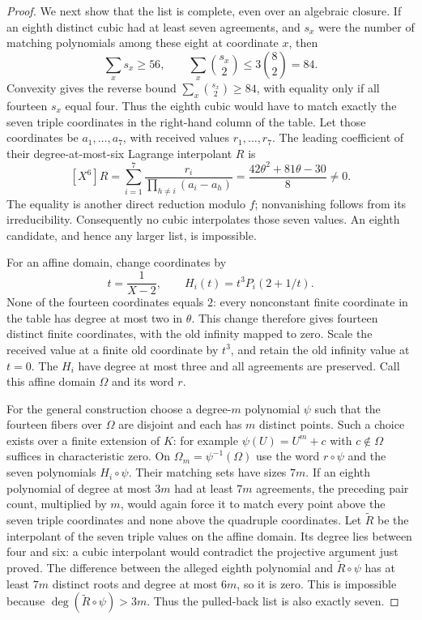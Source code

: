 \begin{proof}
We next show that the list is complete, even over an algebraic closure.
If an eighth distinct cubic had at least seven agreements, and $s_x$
were the number of matching polynomials among these eight at coordinate
$x$, then
\[
 \sum_x s_x\geq56,
 \qquad
 \sum_x\binom{s_x}{2}\leq3\binom82=84.
\]
Convexity gives the reverse bound $\sum_x\binom{s_x}{2}\geq84$,
with equality only if all fourteen $s_x$ equal four.  Thus the eighth
cubic would have to match exactly the seven triple coordinates in the
right-hand column of the table.
Let those coordinates be $a_1,\ldots,a_7$, with received values
$r_1,\ldots,r_7$.  The leading coefficient of their degree-at-most-six
Lagrange interpolant $R$ is
\[
 [X^6]R
 =\sum_{i=1}^7\frac{r_i}{\prod_{h\ne i}(a_i-a_h)}
 =\frac{42\theta^2+81\theta-30}{8}\ne0.
\]
The equality is another direct reduction modulo $f$; nonvanishing follows
from its irreducibility.  Consequently no cubic interpolates those seven
values.  An eighth candidate, and hence any larger list, is impossible.

For an affine domain, change coordinates by
\[
 t=\frac1{X-2},\qquad H_i(t)=t^3P_i(2+1/t).
\]
None of the fourteen coordinates equals $2$: every nonconstant finite
coordinate in the table has degree at most two in $\theta$.
This change therefore gives fourteen distinct finite coordinates, with
the old infinity mapped to zero.  Scale the received value at a finite
old coordinate by $t^3$, and retain the old infinity value at $t=0$.
The $H_i$ have degree at most three and all agreements are preserved.
Call this affine domain $\Omega$ and its word $r$.

For the general construction choose a degree-$m$ polynomial $\psi$
such that the fourteen fibers over $\Omega$ are disjoint and each has
$m$ distinct points.  Such a choice exists over a finite extension of
$K$: for example $\psi(U)=U^m+c$ with $c\notin\Omega$ suffices in
characteristic zero.  On $\Omega_m=\psi^{-1}(\Omega)$ use the word
$r\circ\psi$ and the seven polynomials $H_i\circ\psi$.
Their matching sets have sizes $7m$.
If an eighth polynomial of degree at most $3m$ had at least $7m$
agreements, the preceding pair count, multiplied by $m$, would again
force it to match every point above the seven triple coordinates and
none above the quadruple coordinates.
Let $\widetilde R$ be the interpolant of the seven triple values on the
affine domain.  Its degree lies between four and six: a cubic interpolant
would contradict the projective argument just proved.
The difference between the alleged eighth polynomial and
$\widetilde R\circ\psi$ has at least $7m$ distinct roots and degree at
most $6m$, so it is zero.  This is impossible because
$\deg(\widetilde R\circ\psi)>3m$.  Thus the pulled-back list is also
exactly seven.


\end{proof}
